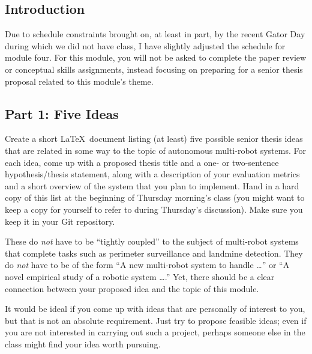 

\usepackage[compact]{titlesec}




\subsection*{Introduction}

Due to schedule constraints brought on, at least in part, by the recent Gator Day during which we did not have class, I
have slightly adjusted the schedule for module four. For this module, you will not be asked to complete the paper review
or conceptual skills assignments, instead focusing on preparing for a senior thesis proposal related to this module's
theme.

\subsection*{Part 1: Five Ideas}

Create a short \LaTeX\ document listing (at least) five possible senior thesis ideas that are related in some way to the
topic of autonomous multi-robot systems. For each idea, come up with a proposed thesis title and a one- or two-sentence
hypothesis/thesis statement, along with a description of your evaluation metrics and a short overview of the system that
you plan to implement. Hand in a hard copy of this list at the beginning of Thursday morning's class (you might want to
keep a copy for yourself to refer to during Thursday's discussion). Make sure you keep it in your Git repository.

These do {\em not} have to be ``tightly coupled'' to the subject of multi-robot systems that complete tasks such as
perimeter surveillance and landmine detection. They do {\em not} have to be of the form ``A new multi-robot system to
handle \ldots'' or ``A novel empirical study of a robotic system \ldots.'' Yet, there should be a clear connection
between your proposed idea and the topic of this module.

It would be ideal if you come up with ideas that are personally of interest to you, but that is not an absolute
requirement. Just try to propose feasible ideas; even if you are not interested in carrying out such a project, perhaps
someone else in the class might find your idea worth pursuing.

